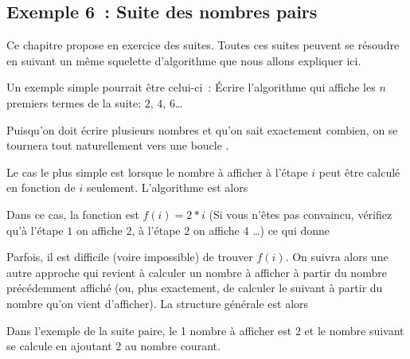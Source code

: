 \subsection{Exemple 6~: Suite des nombres pairs}

	Ce chapitre propose en exercice des suites.
	Toutes ces suites peuvent se résoudre 
	en suivant un même squelette d'algorithme 
	que nous allons expliquer ici.

	Un exemple simple pourrait être celui-ci~:
	\og{}Écrire l'algorithme qui affiche les $n$ premiers termes
	de la suite: $2$, $4$, $6$\dots\fg{}

Puisqu'on doit écrire plusieurs nombres et qu'on sait exactement combien,
on se tournera tout naturellement vers une boucle .

Le cas le plus simple est lorsque le nombre à afficher à l'étape $i$
peut être calculé en fonction de $i$ seulement.
L'algorithme est alors


Dans ce cas, la fonction est $f(i)=2*i$
(Si vous n'êtes pas convaincu, vérifiez qu'à l'étape $1$ on affiche $2$,
à l'étape $2$ on affiche $4$ \dots) ce qui donne


Parfois, il est difficile (voire impossible) de trouver $f(i)$.
On suivra alors une autre approche qui revient à calculer un nombre
à afficher à partir du nombre précédemment affiché
(ou, plus exactement, de calculer le suivant à partir du nombre
qu'on vient d'afficher).
La structure générale est alors


Dans l'exemple de la suite paire, le 1 nombre à afficher est $2$
et le nombre suivant se calcule en ajoutant $2$ au nombre courant.


